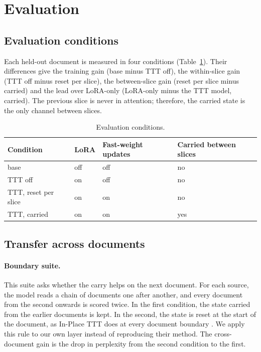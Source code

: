\documentclass[12pt,a4paper]{report}
\begin{document}
\section{Evaluation}

\subsection{Evaluation conditions}

Each held-out document is measured in four conditions (Table~\ref{tab-conditions}). Their differences give the training gain (base minus TTT off), the within-slice gain (TTT off minus reset per slice), the between-slice gain (reset per slice minus carried) and the lead over LoRA-only (LoRA-only minus the TTT model, carried). The previous slice is never in attention; therefore, the carried state is the only channel between slices.

\begin{table}[H]
  \centering
  \small
  \begin{tabular}{llll}
    \toprule
    Condition & LoRA & Fast-weight updates & Carried between slices \\
    \midrule
    base & off & off & no \\
    TTT off & on & off & no \\
    TTT, reset per slice & on & on & no \\
    TTT, carried & on & on & yes \\
    \bottomrule
  \end{tabular}
  \caption{Evaluation conditions.}
  \label{tab-conditions}
\end{table}

\subsection{Transfer across documents}
\paragraph{Boundary suite.} This suite asks whether the carry helps on the next document. For each source, the model reads a chain of documents one after another, and every document from the second onwards is scored twice. In the first condition, the state carried from the earlier documents is kept. In the second, the state is reset at the start of the document, as In-Place TTT does at every document boundary \citep{feng2026inplace}. We apply this rule to our own layer instead of reproducing their method. The cross-document gain is the drop in perplexity from the second condition to the first.
\end{document}
